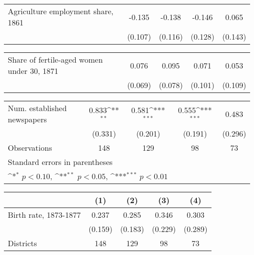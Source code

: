 {
\def\sym#1{\ifmmode^{#1}\else\(^{#1}\)\fi}
\begin{tabular}{l*{4}{c}}
\hline\hline
\hline
Agriculture employment share, 1861&      -0.135         &      -0.138         &      -0.146         &       0.065         \\
                    &     (0.107)         &     (0.116)         &     (0.128)         &     (0.143)         \\
\hline\hline
\end{tabular}
}
{
\def\sym#1{\ifmmode^{#1}\else\(^{#1}\)\fi}
\begin{tabular}{l*{4}{c}}
\hline\hline
\hline
Share of fertile-aged women under 30, 1871&       0.076         &       0.095         &       0.071         &       0.053         \\
                    &     (0.069)         &     (0.078)         &     (0.101)         &     (0.109)         \\
\hline\hline
\end{tabular}
}
{
\def\sym#1{\ifmmode^{#1}\else\(^{#1}\)\fi}
\begin{tabular}{l*{4}{c}}
\hline\hline
\hline
Num. established newspapers&       0.833\sym{**} &       0.581\sym{***}&       0.555\sym{***}&       0.483         \\
                    &     (0.331)         &     (0.201)         &     (0.191)         &     (0.296)         \\
\hline
Observations        &         148         &         129         &          98         &          73         \\
\hline\hline
\multicolumn{5}{l}{\footnotesize Standard errors in parentheses}\\
\multicolumn{5}{l}{\footnotesize \sym{*} \(p<0.10\), \sym{**} \(p<0.05\), \sym{***} \(p<0.01\)}\\
\end{tabular}
}
{
\def\sym#1{\ifmmode^{#1}\else\(^{#1}\)\fi}
\begin{tabular}{l*{4}{c}}
\hline\hline
                    &\multicolumn{1}{c}{(1)}         &\multicolumn{1}{c}{(2)}         &\multicolumn{1}{c}{(3)}         &\multicolumn{1}{c}{(4)}         \\
\hline
Birth rate, 1873-1877&       0.237         &       0.285         &       0.346         &       0.303         \\
                    &     (0.159)         &     (0.183)         &     (0.229)         &     (0.289)         \\
\hline
Districts           &         148         &         129         &          98         &          73         \\
\hline\hline
\end{tabular}
}
